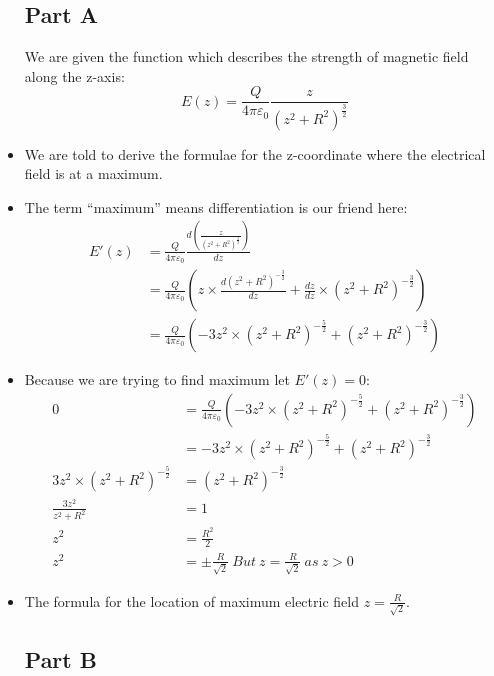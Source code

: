 \documentclass[12pt]{article}
\begin{document}
\begin{itemize}
\subsection{Part A}
We are given the function which describes the strength of magnetic field along the z-axis:
\begin{displaymath}
E(z)=\frac{Q}{4 \pi \varepsilon_0}\frac{z}{(z^2+R^2)^{\frac{3}{2}}}
\end{displaymath}
\item We are told to derive the formulae for the z-coordinate where the electrical field is at a maximum.
\item The term ``maximum'' means differentiation is our friend here:
\setcounter{equation}{0}
\begin{align*}
E'(z)&=\frac{Q}{4 \pi \varepsilon_0} \frac{ d \left(\frac{z}{(z^2+R^2)^{\frac{3}{2}}} \right) }{dz} \\
&=\frac{Q}{4 \pi \varepsilon_0} \left(z \times  \frac{d(z^2+R^2)^{-\frac{3}{2}}}{dz} + \frac{dz}{dz} \times (z^2+R^2)^{-\frac{3}{2}}\right) \\
&=\frac{Q}{4 \pi \varepsilon_0} \left(- 3 z^2 \times (z^2+R^2)^{-\frac{5}{2}} + (z^2+R^2)^{-\frac{3}{2}}\right)
\end{align*}

\item Because we are trying to find maximum let $E'(z)=0$:
\begin{align*}
0&=\frac{Q}{4 \pi \varepsilon_0} \left(- 3 z^2 \times (z^2+R^2)^{-\frac{5}{2}} + (z^2+R^2)^{-\frac{3}{2}}\right) \\
&=- 3 z^2 \times (z^2+R^2)^{-\frac{5}{2}} + (z^2+R^2)^{-\frac{3}{2}} \\
3 z^2 \times (z^2+R^2)^{-\frac{5}{2}} &= (z^2+R^2)^{-\frac{3}{2}} \\
\frac{3 z^2}{ z^2+R^2} &= 1 \\
z^2 &= \frac{R^2}{2} \\
z^2 &= \pm\frac{R}{\sqrt{2}} \ But \ z= \frac{R}{\sqrt{2}} \ as \ z > 0
\end{align*}
\item The formula for the location of maximum electric field $z= \frac{R}{\sqrt{2}}$.
\pagebreak
\subsection{Part B}
\end{itemize}
\end{document}
